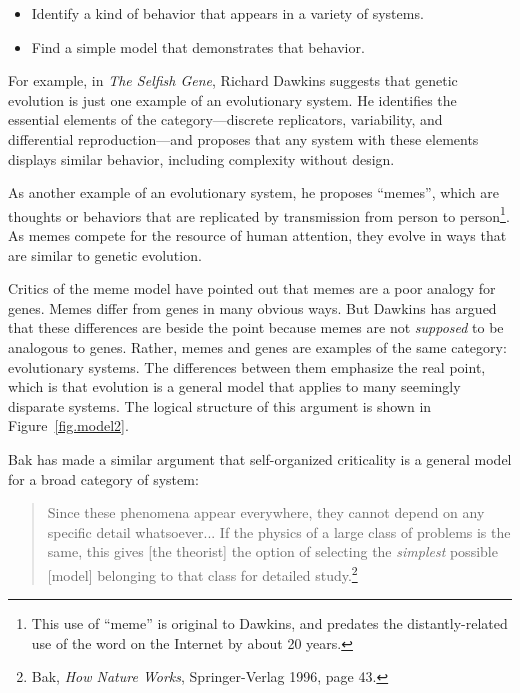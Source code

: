 \documentclass[12pt]{book}
\theoremstyle{exercise}
\begin{document}

\begin{itemize}

\item Identify a kind of behavior that appears in a variety of
systems.

\item Find a simple model that demonstrates that behavior.

\end{itemize}

For example, in {\em The Selfish Gene}, Richard Dawkins suggests that
genetic evolution is just one example of an evolutionary system.  He
identifies the essential elements of the category---discrete
replicators, variability, and differential reproduction---and proposes
that any system with these elements displays similar
behavior, including complexity without design.


As another example of an evolutionary system, he proposes ``memes'',
which are thoughts or behaviors that are replicated by transmission
from person to person\footnote{This use of ``meme'' is original to
  Dawkins, and predates the distantly-related use of the word on the
  Internet by about 20 years.}.  As memes compete for the resource of
human attention, they evolve in ways that are similar to genetic
evolution.


Critics of the meme model have pointed out that
memes are a poor analogy for genes.  Memes differ from genes in many
obvious ways.  But Dawkins has argued that these differences are
beside the point because memes are not {\em supposed} to be analogous
to genes.  Rather, memes and genes are examples of the same
category: evolutionary systems.  The differences between them
emphasize the real point, which is that evolution is a general model
that applies to many seemingly disparate systems.  The logical
structure of this argument is shown in Figure~\ref{fig.model2}.


Bak has made a similar argument that self-organized criticality is a
general model for a broad category of system:

\begin{quote}
Since these phenomena appear everywhere, they cannot depend on any
specific detail whatsoever...  If the physics of a large class of
problems is the same, this gives [the theorist] the option of selecting
the {\em simplest} possible [model] belonging to that class for detailed
study.\footnote{Bak, {\em How Nature Works}, Springer-Verlag 1996, page 43.}
\end{quote}
\end{document}
